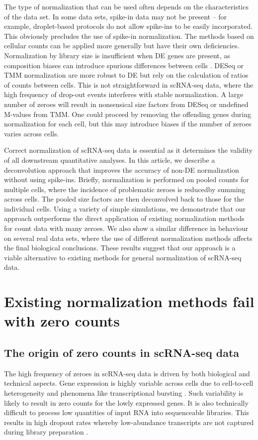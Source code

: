 \documentclass{article}
\begin{document}
The type of normalization that can be used often depends on the characteristics of the data set.
In some data sets, spike-in data may not be present -- for example, droplet-based protocols \cite{klein2015droplet,macosko2015highly} do not allow spike-ins to be easily incorporated.
This obviously precludes the use of spike-in normalization.
The methods based on cellular counts can be applied more generally but have their own deficiencies.
Normalization by library size is insufficient when DE genes are present, as composition biases can introduce spurious differences between cells \cite{robinson2010scaling}.
DESeq or TMM normalization are more robust to DE but rely on the calculation of ratios of counts between cells.
This is not straightforward in scRNA-seq data, where the high frequency of drop-out events interferes with stable normalization.
A large number of zeroes will result in nonsensical size factors from DESeq or undefined M-values from TMM.
One could proceed by removing the offending genes during normalization for each cell, but this may introduce biases if the number of zeroes varies across cells.

Correct normalization of scRNA-seq data is essential as it determines the validity of all downstream quantitative analyses.
In this article, we describe a deconvolution approach that improves the accuracy of non-DE normalization without using spike-ins.
Briefly, normalization is performed on pooled counts for multiple cells, where the incidence of problematic zeroes is reducedby summing across cells.
The pooled size factors are then deconvolved back to those for the individual cells.
Using a variety of simple simulations, we demonstrate that our approach outperforms the direct application of existing normalization methods for count data with many zeroes.
We also show a similar difference in behaviour on several real data sets, where the use of different normalization methods affects the final biological conclusions.
These results suggest that our approach is a viable alternative to existing methods for general normalization of scRNA-seq data.

\section{Existing normalization methods fail with zero counts}

\subsection{The origin of zero counts in scRNA-seq data}
The high frequency of zeroes in scRNA-seq data is driven by both biological and technical aspects.
Gene expression is highly variable across cells due to cell-to-cell heterogeneity and phenomena like transcriptional bursting \cite{marinov2014singlecell}.
Such variability is likely to result in zero counts for the lowly expressed genes.
It is also technically difficult to process low quantities of input RNA into sequenceable libraries.
This results in high dropout rates whereby low-abundance transcripts are not captured during library preparation \cite{brennecke2013accounting}.
\end{document}
